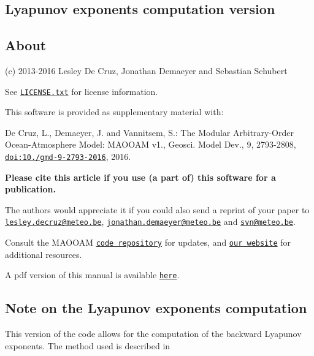 \subsection*{Lyapunov exponents computation version}





\subsection*{About}

(c) 2013-\/2016 Lesley De Cruz, Jonathan Demaeyer and Sebastian Schubert

See \href{../LICENSE.txt}{\tt L\+I\+C\+E\+N\+S\+E.\+txt} for license information.

This software is provided as supplementary material with\+:


\begin{DoxyItemize}
\item De Cruz, L., Demaeyer, J. and Vannitsem, S.\+: The Modular Arbitrary-\/\+Order Ocean-\/\+Atmosphere Model\+: M\+A\+O\+O\+AM v1., Geosci. Model Dev., 9, 2793-\/2808, \href{http://dx.doi.org/10.5194/gmd-9-2793-2016}{\tt doi\+:10./gmd-\/9-\/2793-\/2016}, 2016.
\end{DoxyItemize}

{\bfseries Please cite this article if you use (a part of) this software for a publication.}

The authors would appreciate it if you could also send a reprint of your paper to \href{mailto:lesley.decruz@meteo.be}{\tt lesley.\+decruz@meteo.\+be}, \href{mailto:jonathan.demaeyer@meteo.be}{\tt jonathan.\+demaeyer@meteo.\+be} and \href{mailto:svn@meteo.be}{\tt svn@meteo.\+be}.

Consult the M\+A\+O\+O\+AM \href{http://www.github.com/Climdyn/MAOOAM}{\tt code repository} for updates, and \href{http://climdyn.meteo.be}{\tt our website} for additional resources.

A pdf version of this manual is available \href{../latex/Reference_manual.pdf}{\tt here}. 



\subsection*{Note on the Lyapunov exponents computation}

This version of the code allows for the computation of the backward Lyapunov exponents. The method used is described in


